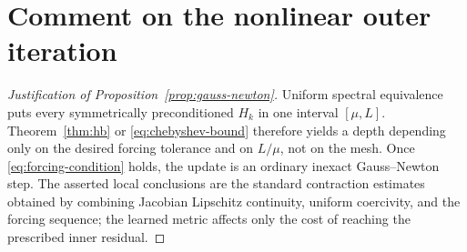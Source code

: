 \documentclass[11pt,a4paper]{article}
\numberwithin{equation}{section}
\theoremstyle{definition}
\theoremstyle{remark}
\begin{document}
\section{Comment on the nonlinear outer iteration}

\begin{proof}[Justification of Proposition~\ref{prop:gauss-newton}]
Uniform spectral equivalence puts every symmetrically preconditioned $H_k$ in
one interval $[\mu,L]$.  Theorem~\ref{thm:hb} or
\eqref{eq:chebyshev-bound} therefore yields a depth depending only on the
desired forcing tolerance and on $L/\mu$, not on the mesh.  Once
\eqref{eq:forcing-condition} holds, the update is an ordinary inexact
Gauss--Newton step.  The asserted local conclusions are the standard
contraction estimates obtained by combining Jacobian Lipschitz continuity,
uniform coercivity, and the forcing sequence; the learned metric affects only
the cost of reaching the prescribed inner residual.
\end{proof}


\begingroup
\small

\endgroup
\end{document}
